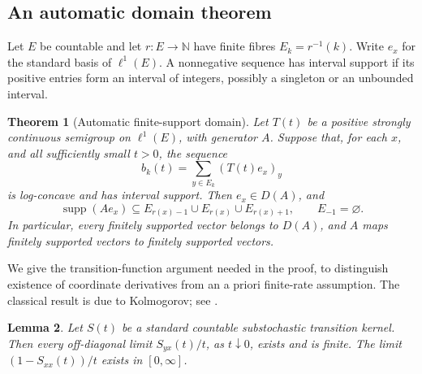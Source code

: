 \documentclass[reqno]{amsart}
\newtheorem{theorem}{Theorem}[section]
\newtheorem{lemma}[theorem]{Lemma}
\theoremstyle{definition}
\theoremstyle{remark}
\newcommand{\N}{\mathbb N}
\DeclareMathOperator{\supp}{supp}
\begin{document}
\subsection{An automatic domain theorem}

Let \(E\) be countable and let \(r:E\to\N\) have finite fibres
\(E_k=r^{-1}(k)\).  Write \(e_x\) for the standard basis of \(\ell^1(E)\).
A nonnegative sequence has interval support if its positive entries form an
interval of integers, possibly a singleton or an unbounded interval.

\begin{theorem}[Automatic finite-support domain]\label{ana:domain}
Let \(T(t)\) be a positive strongly continuous semigroup on \(\ell^1(E)\),
with generator \(A\).  Suppose that, for each \(x\), and all sufficiently small
\(t>0\), the sequence
\[
 b_k(t)=\sum_{y\in E_k}(T(t)e_x)_y
\]
is log-concave and has interval support.  Then \(e_x\in D(A)\), and
\[
 \supp(Ae_x)\subseteq E_{r(x)-1}\cup E_{r(x)}\cup E_{r(x)+1},
 \qquad E_{-1}=\varnothing .
\]
In particular, every finitely supported vector belongs to \(D(A)\), and
\(A\) maps finitely supported vectors to finitely supported vectors.
\end{theorem}

We give the transition-function argument needed in the proof, to distinguish
existence of coordinate derivatives from an a priori finite-rate assumption.
The classical result is due to Kolmogorov; see \cite{Chung67,Kendall55}.

\begin{lemma}\label{ana:transition-derivatives}
Let \(S(t)\) be a standard countable substochastic transition kernel.  Then
every off-diagonal limit \(S_{yx}(t)/t\), as \(t\downarrow0\), exists and is
finite.  The limit \((1-S_{xx}(t))/t\) exists in \([0,\infty]\).
\end{lemma}
\end{document}
